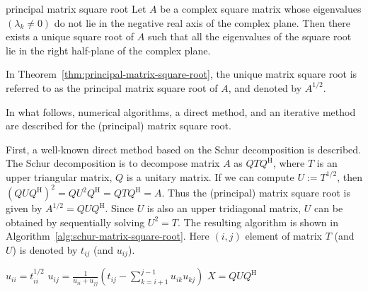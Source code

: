 \begin{Theorem}{{principal matrix square root}}\label{thm:principal-matrix-square-root}
{Let $A$ be a complex square matrix whose eigenvalues $(\lambda_k\ne0)$ do not lie in the negative real axis of the complex plane. Then there exists a unique square root of $A$ such that all the eigenvalues of the square root lie in the right half-plane of the complex plane.}
\end{Theorem}

{In Theorem~\ref{thm:principal-matrix-square-root}, the unique matrix square root is referred to as the principal matrix square root of $A$, and denoted by $A^{1/2}$.}

{In what follows, numerical algorithms, a direct method, and an iterative method are described for the (principal) matrix square root.}

{First, a well-known direct method based on the Schur decomposition is described. The Schur decomposition is to decompose matrix $A$ as $QTQ^{\mathrm H}$, where $T$ is an upper triangular matrix, $Q$ is a unitary matrix. If we can compute $U:=T^{1/2}$, then $(QUQ^{\mathrm H})^2=QU^2Q^{\mathrm H}=QTQ^{\mathrm H}=A$. Thus the (principal) matrix square root is given by $A^{1/2}=QUQ^{\mathrm H}$. Since $U$ is also an upper tridiagonal matrix, $U$ can be obtained by sequentially solving $U^2=T$. The resulting algorithm is shown in Algorithm~\ref{alg:schur-matrix-square-root}. Here $(i,j)$ element of matrix $T$ (and $U$) is denoted by $t_{ij}$ (and $u_{ij}$).}

\begin{algorithm}[H]\caption{{(Direct method) The Schur method for $X=A^{1/2}$}}\label{alg:schur-matrix-square-root}\begin{algorithmic}[1]
\State $u_{ii}=t_{ii}^{1/2}$
\EndFor
{}
\State $u_{ij}=\frac{1}{u_{ii}+u_{jj}}(t_{ij}-\sum_{k=i+1}^{j-1}u_{ik}u_{kj})$
\EndFor
\EndFor
\State $X=QUQ^{\mathrm H}$
\end{algorithmic}\end{algorithm}

